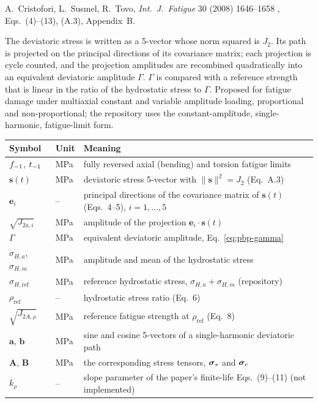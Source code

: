 \label{sheet:PBP}

 A.~Cristofori, L.~Susmel, R.~Tovo, \emph{Int.\ J.\ Fatigue} 30 (2008) 1646--1658
\cite{cristofori2008}, Eqs.~(4)--(13), (A.3), Appendix~B.

 The deviatoric stress is written as a 5-vector whose norm squared is $J_2$. Its
path is projected on the principal directions of its covariance matrix; each projection is cycle
counted, and the projection amplitudes are recombined quadratically into an equivalent deviatoric
amplitude $\Gamma$. $\Gamma$ is compared with a reference strength that is linear in the ratio of the
hydrostatic stress to $\Gamma$. Proposed for fatigue damage under multiaxial constant and variable
amplitude loading, proportional and non-proportional; the repository uses the constant-amplitude,
single-harmonic, fatigue-limit form.

\begin{center}\small
\begin{tabular}{@{}llp{100mm}@{}}
\toprule
Symbol & Unit & Meaning\\\midrule
$f_{-1}$, $t_{-1}$ & MPa & fully reversed axial (bending) and torsion fatigue limits\\
$\mathbf s(t)$ & MPa & deviatoric stress 5-vector with $\lVert\mathbf s\rVert^2=J_2$ (Eq.~A.3)\\
$\mathbf e_i$ & -- & principal directions of the covariance matrix of $\mathbf s(t)$ (Eqs.~4--5), $i=1,\dots,5$\\
$\sqrt{J_{2a,i}}$ & MPa & amplitude of the projection $\mathbf e_i\cdot\mathbf s(t)$\\
$\Gamma$ & MPa & equivalent deviatoric amplitude, Eq.~\eqref{eq:pbp-gamma}\\
$\sigma_{H,a}$, $\sigma_{H,m}$ & MPa & amplitude and mean of the hydrostatic stress\\
$\sigma_{H,\mathrm{ref}}$ & MPa & reference hydrostatic stress, $\sigma_{H,a}+\sigma_{H,m}$ (repository)\\
$\rho_{\mathrm{ref}}$ & -- & hydrostatic stress ratio (Eq.~6)\\
$\sqrt{J_{2A,\rho}}$ & MPa & reference fatigue strength at $\rho_{\mathrm{ref}}$ (Eq.~8)\\
$\mathbf a$, $\mathbf b$ & MPa & sine and cosine 5-vectors of a single-harmonic deviatoric path\\
$\mathbf A$, $\mathbf B$ & MPa & the corresponding stress tensors, $\boldsymbol\sigma_s$ and $\boldsymbol\sigma_c$\\
$k_\rho$ & -- & slope parameter of the paper's finite-life Eqs.~(9)--(11) (not implemented)\\
\bottomrule
\end{tabular}
\end{center}

